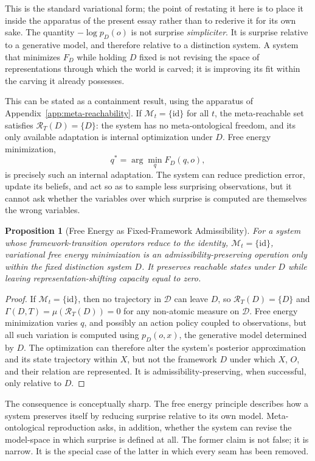 \documentclass[11pt]{article}
\theoremstyle{plain}
\newtheorem{proposition}{Proposition}[section]
\begin{document}
This is the standard variational form; the point of restating it here is to place it inside the apparatus of the present essay rather than to rederive it for its own sake. The quantity $-\log p_D(o)$ is not surprise \emph{simpliciter}. It is surprise relative to a generative model, and therefore relative to a distinction system. A system that minimizes $F_D$ while holding $D$ fixed is not revising the space of representations through which the world is carved; it is improving its fit within the carving it already possesses.

This can be stated as a containment result, using the apparatus of Appendix~\ref{app:meta-reachability}. If $\mathcal{M}_t = \{\mathrm{id}\}$ for all $t$, the meta-reachable set satisfies $\mathcal{R}_T(D) = \{D\}$: the system has no meta-ontological freedom, and its only available adaptation is internal optimization under $D$. Free energy minimization,
\[
q^\ast = \arg\min_q F_D(q,o),
\]
is precisely such an internal adaptation. The system can reduce prediction error, update its beliefs, and act so as to sample less surprising observations, but it cannot ask whether the variables over which surprise is computed are themselves the wrong variables.

\begin{proposition}[Free Energy as Fixed-Framework Admissibility]
For a system whose framework-transition operators reduce to the identity, $\mathcal{M}_t = \{\mathrm{id}\}$, variational free energy minimization is an admissibility-preserving operation only within the fixed distinction system $D$. It preserves reachable states under $D$ while leaving representation-shifting capacity equal to zero.
\end{proposition}
\begin{proof}
If $\mathcal{M}_t = \{\mathrm{id}\}$, then no trajectory in $\mathcal{D}$ can leave $D$, so $\mathcal{R}_T(D) = \{D\}$ and $\Gamma(D,T) = \mu(\mathcal{R}_T(D)) = 0$ for any non-atomic measure on $\mathcal{D}$. Free energy minimization varies $q$, and possibly an action policy coupled to observations, but all such variation is computed using $p_D(o,x)$, the generative model determined by $D$. The optimization can therefore alter the system's posterior approximation and its state trajectory within $X$, but not the framework $D$ under which $X$, $O$, and their relation are represented. It is admissibility-preserving, when successful, only relative to $D$.
\end{proof}

The consequence is conceptually sharp. The free energy principle describes how a system preserves itself by reducing surprise relative to its own model. Meta-ontological reproduction asks, in addition, whether the system can revise the model-space in which surprise is defined at all. The former claim is not false; it is narrow. It is the special case of the latter in which every seam has been removed.
\end{document}
